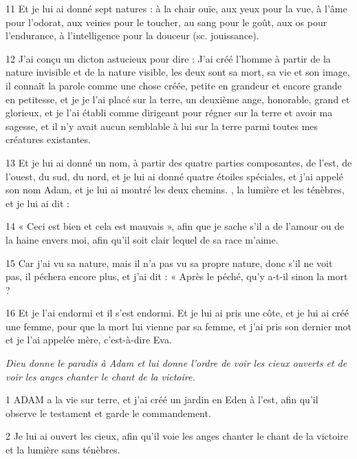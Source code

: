 \par 11 Et je lui ai donné sept natures : à la chair ouïe, aux yeux pour la vue, à l'âme pour l'odorat, aux veines pour le toucher, au sang pour le goût, aux os pour l'endurance, à l'intelligence pour la douceur (sc. jouissance).

\par 12 J'ai conçu un dicton astucieux pour dire : J'ai créé l'homme à partir de la nature invisible et de la nature visible, les deux sont sa mort, sa vie et son image, il connaît la parole comme une chose créée, petite en grandeur et encore grande en petitesse, et je je l'ai placé sur la terre, un deuxième ange, honorable, grand et glorieux, et je l'ai établi comme dirigeant pour régner sur la terre et avoir ma sagesse, et il n'y avait aucun semblable à lui sur la terre parmi toutes mes créatures existantes.

\par 13 Et je lui ai donné un nom, à partir des quatre parties composantes, de l'est, de l'ouest, du sud, du nord, et je lui ai donné quatre étoiles spéciales, et j'ai appelé son nom Adam, et je lui ai montré les deux chemins. , la lumière et les ténèbres, et je lui ai dit :

\par 14 « Ceci est bien et cela est mauvais », afin que je sache s'il a de l'amour ou de la haine envers moi, afin qu'il soit clair lequel de sa race m'aime.

\par 15 Car j'ai vu sa nature, mais il n'a pas vu sa propre nature, donc s'il ne voit pas, il péchera encore plus, et j'ai dit : « Après le péché, qu'y a-t-il sinon la mort ?

\par 16 Et je l'ai endormi et il s'est endormi. Et je lui ai pris une côte, et je lui ai créé une femme, pour que la mort lui vienne par sa femme, et j'ai pris son dernier mot et je l'ai appelée mère, c'est-à-dire Eva.


\par \textit{Dieu donne le paradis à Adam et lui donne l'ordre de voir les cieux ouverts et de voir les anges chanter le chant de la victoire.}

\par 1 ADAM a la vie sur terre, et j'ai créé un jardin en Eden à l'est, afin qu'il observe le testament et garde le commandement.

\par 2 Je lui ai ouvert les cieux, afin qu'il voie les anges chanter le chant de la victoire et la lumière sans ténèbres.

